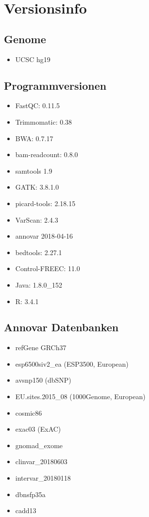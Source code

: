 \documentclass[woside,a4paper,12pt]{article}\usepackage[]{graphicx}\usepackage[]{color}
\begin{document}
\clearpage

\section{Versionsinfo}

\subsection{Genome}
\begin{itemize}
\item UCSC hg19
\end{itemize}

\subsection{Programmversionen}
\begin{itemize}
\item FastQC: 0.11.5
\item Trimmomatic: 0.38
\item BWA: 0.7.17
\item bam-readcount: 0.8.0
\item samtools 1.9
\item GATK: 3.8.1.0
\item picard-tools: 2.18.15
\item VarScan: 2.4.3
\item annovar 2018-04-16
\item bedtools: 2.27.1
\item Control-FREEC: 11.0
\item Java: 1.8.0\_152
\item R: 3.4.1
\end{itemize}

\subsection{Annovar Datenbanken}
\begin{itemize}
\item refGene GRCh37
\item esp6500siv2\_ea (ESP3500, European)
\item avsnp150 (dbSNP)
\item EU.sites.2015\_08 (1000Genome, European)
\item cosmic86
\item exac03 (ExAC)
\item gnomad\_exome
\item clinvar\_20180603
\item intervar\_20180118
\item dbnsfp35a
\item cadd13
\end{itemize}
\end{document}
